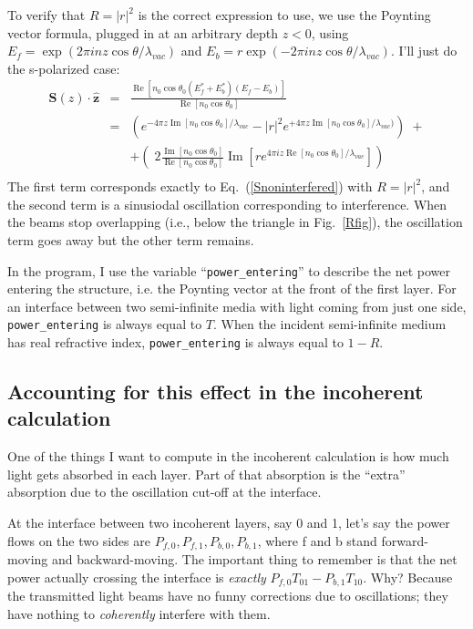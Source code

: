 \documentclass[12pt]{article}
\newcommand{\bea}{\begin{eqnarray*}} %
\newcommand{\eea}{\end{eqnarray*}} %
\renewcommand{\(}{\left(}
\renewcommand{\)}{\right)}
\renewcommand{\Im}{\operatorname{Im}}
\renewcommand{\Re}{\operatorname{Re}}
\renewcommand{\S}{\mathbf{S}}
\newcommand{\z}{\hat{\mathbf{z}}}
\begin{document}
To verify that $R=|r|^2$ is the correct expression to use, we use the Poynting vector formula, plugged in at an arbitrary depth $z<0$, using $E_f = \exp(2\pi i n z \cos \theta / \lambda_{vac})$ and $E_b = r \exp(-2\pi i n z \cos\theta/\lambda_{vac})$. I'll just do the s-polarized case:
\bea
\S(z)\cdot\z
&=& \frac{\Re[n_0 \cos \theta_0 (E_f^* + E_b^*)(E_f-E_b)]}{\Re[n_0 \cos \theta_0]}\\
&=& \(e^{-4\pi z \Im[n_0 \cos \theta_0]/\lambda_{vac}}-|r|^2 e^{+4\pi z \Im[n_0 \cos \theta_0]/\lambda_{vac})}\) \; +\\
&\;& + \( \; 2\frac{\Im[n_0 \cos\theta_0]}{\Re[n_0 \cos \theta_0]} \Im [r e^{4\pi i z\Re[n_0  \cos \theta_0]/\lambda_{vac}}] \)\\
\eea
The first term corresponds exactly to Eq.~(\ref{Snoninterfered}) with $R=|r|^2$, and the second term is a sinusiodal oscillation corresponding to interference. When the beams stop overlapping (i.e., below the triangle in Fig.~\ref{Rfig}), the oscillation term goes away but the other term remains.

In the program, I use the variable ``\verb=power_entering='' to describe the net power entering the structure, i.e. the Poynting vector at the front of the first layer. For an interface between two semi-infinite media with light coming from just one side, \verb=power_entering= is always equal to $T$. When the incident semi-infinite medium has real refractive index, \verb=power_entering= is always equal to $1-R$.

\subsection{Accounting for this effect in the incoherent calculation}

One of the things I want to compute in the incoherent calculation is how much light gets absorbed in each layer. Part of that absorption is the ``extra'' absorption due to the oscillation cut-off at the interface.

At the interface between two incoherent layers, say 0 and 1, let's say the power flows on the two sides are $P_{f,0},P_{f,1},P_{b,0},P_{b,1}$, where f and b stand forward-moving and backward-moving. The important thing to remember is that the net power actually crossing the interface is \emph{exactly} $P_{f,0}T_{01} - P_{b,1}T_{10}$. Why? Because the transmitted light beams have no funny corrections due to oscillations; they have  nothing to \emph{coherently} interfere with them.
\end{document}
